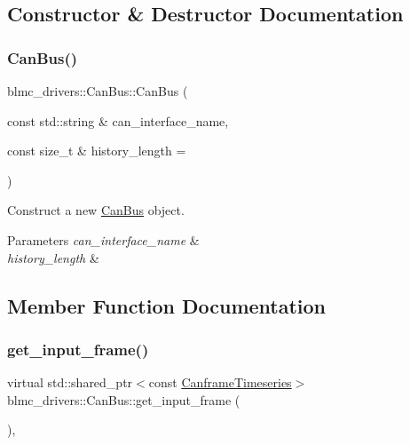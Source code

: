 \subsection{Constructor \& Destructor Documentation}
\mbox{\label{classblmc__drivers_1_1CanBus_a7d376f1ebd6dd8bc3299f6fc9f3d42c6}} 
\subsubsection{\texorpdfstring{Can\+Bus()}{CanBus()}}
{\footnotesize\ttfamily blmc\+\_\+drivers\+::\+Can\+Bus\+::\+Can\+Bus (\begin{DoxyParamCaption}\item[{const std\+::string \&}]{can\+\_\+interface\+\_\+name,  }\item[{const size\+\_\+t \&}]{history\+\_\+length = {} }\end{DoxyParamCaption})}



Construct a new \hyperlink{classblmc__drivers_1_1CanBus}{Can\+Bus} object. 


\begin{DoxyParams}{Parameters}
{\em can\+\_\+interface\+\_\+name} & \\
\hline
{\em history\+\_\+length} & \\
\hline
\end{DoxyParams}


\subsection{Member Function Documentation}
\mbox{\label{classblmc__drivers_1_1CanBus_a5b9282bc65bff196e6d6b393fbdc5891}} 
\subsubsection{\texorpdfstring{get\+\_\+input\+\_\+frame()}{get\_input\_frame()}}
{\footnotesize\ttfamily virtual std\+::shared\+\_\+ptr$<$const \hyperlink{classblmc__drivers_1_1CanBusInterface_a2da2627c961927f48359ae7d7e1aa4da}{Canframe\+Timeseries}$>$ blmc\+\_\+drivers\+::\+Can\+Bus\+::get\+\_\+input\+\_\+frame (\begin{DoxyParamCaption}{ }\end{DoxyParamCaption})\hspace{0.3cm}{\ttfamily [inline]}, {\ttfamily [virtual]}}



